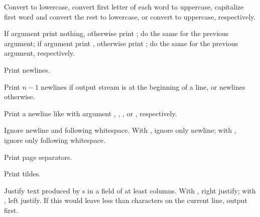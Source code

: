 \begin{LIST}{1cm}
\begin{LIST}{.5cm}
    {%
      Convert  to lowercase, convert first letter of each word
      to uppercase, capitalize first word and convert the rest to
      lowercase, or convert to uppercase, respectively. 
    }

    {%
      If argument   print nothing, otherwise print ;
      do the same for the previous argument; if argument  
      print , otherwise print ; do the same for the
      previous argument, respectively.  
    }

    {%
      Print  newlines.
    }

    {%
      Print $n-1$ newlines if output stream is at the
      beginning of a line, or  newlines otherwise.
    }

    {%
      Print a newline like  with argument
      , , , or , respectively.
    }

    {
       Ignore newline and following
      whitespace. With \kwd{:}, ignore only newline; with ,
      ignore only following whitespace.
    }

    {%
      Print  page separators.
    }

    {%
      Print  tildes.
    }

    {%
      Justify text produced by s in a field of at least
       columns. With \kwd{:}, right justify; with ,
      left justify. If this would leave less than  characters
      on the current line, output  first.
    }


\end{LIST}
\end{LIST}
